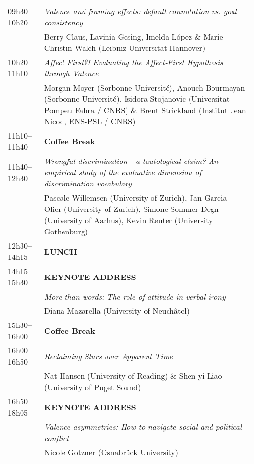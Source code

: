 \documentclass[a4paper,12pt]{article}
\begin{document}
\begin{center}
\begin{tabularx}{\textwidth}{>{\raggedright\arraybackslash}p{3cm} X}
\hline
09h30--10h20 & \textit{Valence and framing effects: default connotation vs. goal consistency} \\
            & Berry Claus, Lavinia Gesing, Imelda López \& Marie Christin Walch (Leibniz Universität Hannover) \\
\hline
10h20--11h10 & \textit{Affect First?! Evaluating the Affect-First Hypothesis through Valence} \\
             & Morgan Moyer (Sorbonne Université), Anouch Bourmayan (Sorbonne Université), Isidora Stojanovic (Universitat Pompeu Fabra / CNRS) \& Brent Strickland (Institut Jean Nicod, ENS-PSL / CNRS) \\
\hline
11h10--11h40 & \textbf{Coffee Break} \\
\hline
11h40--12h30 & \textit{Wrongful discrimination - a tautological claim? An empirical study of the evaluative dimension of discrimination vocabulary} \\
             & Pascale Willemsen (University of Zurich), Jan Garcia Olier (University of Zurich), Simone Sommer Degn (University of Aarhus), Kevin Reuter (University Gothenburg) \\
\hline
12h30--14h15 & \textbf{LUNCH} \\
\hline
14h15--15h30 & \textbf{KEYNOTE ADDRESS} \\
             & \textit{More than words: The role of attitude in verbal irony} \\
             & Diana Mazarella (University of Neuchâtel) \\
\hline
15h30--16h00 & \textbf{Coffee Break} \\
\hline
16h00--16h50 & \textit{Reclaiming Slurs over Apparent Time} \\
             & Nat Hansen (University of Reading) \& Shen-yi Liao (University of Puget Sound) \\
\hline
16h50--18h05 & \textbf{KEYNOTE ADDRESS} \\
             & \textit{Valence asymmetries: How to navigate social and political conflict} \\
             & Nicole Gotzner (Osnabrück University) \\
\hline 
\end{tabularx}
\end{center}
\end{document}
